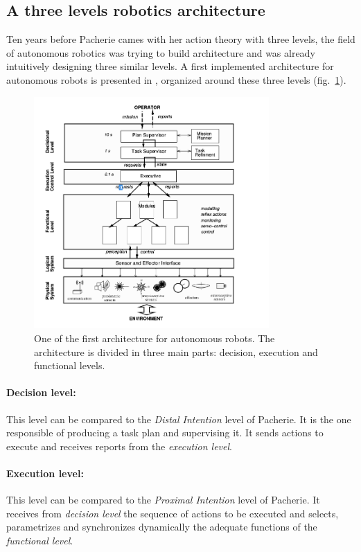 \documentclass[english,a4paper,11pt,twoside]{StyleThese}
\begin{document}
\subsection{A three levels robotics architecture}

\label{subsec:Archi}

Ten years before Pacherie cames with her action theory with three levels, the field of autonomous robotics was trying to build architecture and was already intuitively designing three similar levels. A first implemented architecture for autonomous robots is presented in \cite{alami1998architecture}, organized around these three levels (fig.~\ref{fig:FirstArchi}).

\begin{figure}[!h]
	\centering
    \includegraphics[width=0.8\textwidth]{figs/Chapter1/ArchitectureHold.png}
    \caption{One of the first architecture for autonomous robots. The architecture is divided in three main parts: decision, execution and functional levels.}
    \label{fig:FirstArchi}
\end{figure}

\paragraph{Decision level:}
This level can be compared to the \textit{Distal Intention} level of Pacherie. It is the one responsible of producing a task plan and supervising it. It sends actions to execute and receives reports from the \textit{execution level}.

\paragraph{Execution level:}
This level can be compared to the \textit{Proximal Intention} level of Pacherie. It receives from \textit{decision level} the sequence of actions to be executed and selects, parametrizes and synchronizes dynamically the adequate functions of the \textit{functional level}.
\end{document}
